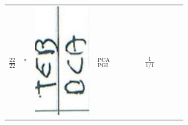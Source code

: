 \documentclass[10pt]{article}
\begin{document}
\begin{center}
\begin{tabular}{|c|c|c|c|c|c|c|c|c|c|c|}
{{}} &  &  &  &  \\
\hline
\(\frac{22}{22}\) & " & \includegraphics[max width=\textwidth]{2025_02_27_dd68c3d38de88f0516d9g-082}
 & \({ }_{\text {PGI }}^{\text {PCA }}\) &  &  &  & \(\frac{1}{1 / 1}\) &  &  &  \\

\end{tabular}
\end{center}
\end{document}
